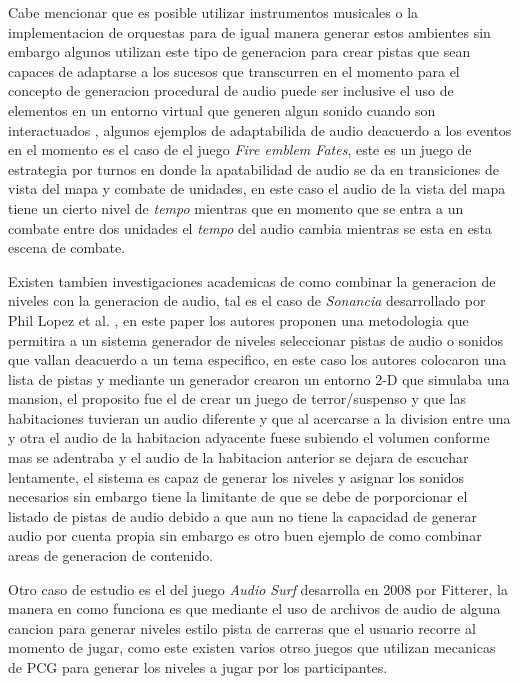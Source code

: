 Cabe mencionar que es posible utilizar instrumentos musicales o la
implementacion de orquestas para de igual manera generar estos ambientes sin
embargo algunos utilizan este tipo de generacion para crear pistas que sean
capaces de adaptarse a los sucesos que transcurren en el momento para el
concepto de generacion procedural de audio puede ser inclusive el uso de
elementos en un entorno virtual que generen algun sonido cuando son
interactuados \cite{garner2014sonic}, algunos ejemplos de adaptabilida de audio
deacuerdo a los eventos en el momento es el caso de el juego \textit{Fire emblem
Fates}, este es un juego de estrategia por turnos en donde la apatabilidad de
audio se da en transiciones de vista del mapa y combate de unidades, en este
caso el audio de la vista del mapa tiene un cierto nivel de \textit{tempo}
mientras que en momento que se entra a un combate entre dos unidades el
\textit{tempo} del audio cambia mientras se esta en esta escena de combate.

Existen tambien investigaciones academicas de como combinar la generacion de
niveles con la generacion de audio, tal es el caso de \textit{Sonancia}
desarrollado por Phil Lopez et al. \cite{lopes2015sonancia}, en este paper los
autores proponen una metodologia que permitira a un sistema generador de niveles
seleccionar pistas de audio o sonidos que vallan deacuerdo a un tema especifico,
en este caso los autores colocaron una lista de pistas y mediante un generador
crearon un entorno 2-D que simulaba una mansion, el proposito fue el de crear un
juego de terror/suspenso y que las habitaciones tuvieran un audio diferente y
que al acercarse a la division entre una y otra el audio de la habitacion
adyacente fuese subiendo el volumen conforme mas se adentraba y el audio de la
habitacion anterior se dejara de escuchar lentamente, el sistema es capaz de
generar los niveles y asignar los sonidos necesarios sin embargo tiene la
limitante de que se debe de porporcionar el listado de pistas de audio debido a
que aun no tiene la capacidad de generar audio por cuenta propia sin embargo es
otro buen ejemplo de como combinar areas de generacion de contenido.

Otro caso de estudio es el del juego \textit{Audio Surf} desarrolla en 2008 por
Fitterer, la manera en como funciona es que mediante el uso de archivos de audio
de alguna cancion para generar niveles estilo pista de carreras que el usuario
recorre al momento de jugar, como este existen varios otrso juegos que utilizan
mecanicas de PCG para generar los niveles a jugar por los participantes.

